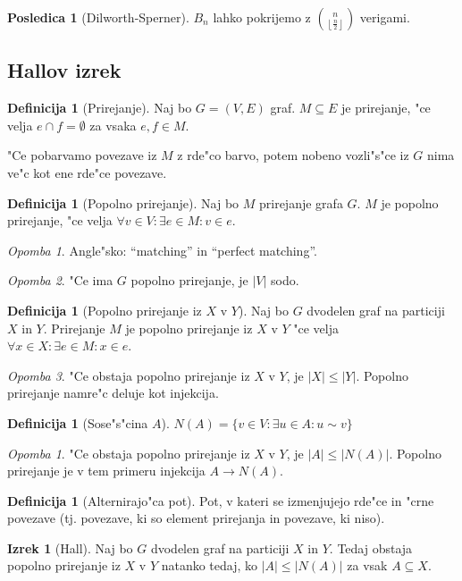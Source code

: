 \documentclass[a4paper,12pt]{article}
\theoremstyle{definition}
\newtheorem{defn}[counter]{Definicija}
\newtheorem{conseq}[counter]{Posledica}
\newtheorem{theorem}[counter]{Izrek}
\theoremstyle{remark}
\newtheorem*{rem}{Opomba}
\newtheorem{rem*}[counter]{Opomba}
\begin{document}
\begin{conseq}[Dilworth-Sperner]
	$B_n$ lahko pokrijemo z $\binom{n}{\left\lfloor\frac{n}{2}\right\rfloor}$ verigami.
\end{conseq}

\subsection{Hallov izrek}
\begin{defn}[Prirejanje]
	Naj bo $G=(V, E)$ graf. $M \subseteq E$ je prirejanje, "ce velja $e \cap f = \emptyset$ za vsaka $e, f \in M$.
\end{defn}
"Ce pobarvamo povezave iz $M$ z rde"co barvo, potem nobeno vozli"s"ce iz $G$ nima ve"c kot ene rde"ce povezave.
\begin{defn}[Popolno prirejanje]
	Naj bo $M$ prirejanje grafa $G$. $M$ je popolno prirejanje, "ce velja $\forall v \in V: \exists e \in M: v \in e$.
\end{defn}
\begin{rem}
	Angle"sko: ``matching'' in ``perfect matching''.
\end{rem}
\begin{rem}
	"Ce ima $G$ popolno prirejanje, je $|V|$ sodo.
\end{rem}
\begin{defn}[Popolno prirejanje iz $X$ v $Y$]
	Naj bo $G$ dvodelen graf na particiji $X$ in $Y$. Prirejanje $M$ je popolno prirejanje iz $X$ v $Y$ "ce velja $\forall x \in X: \exists e \in M: x \in e$.
\end{defn}
\begin{rem}
	"Ce obstaja popolno prirejanje iz $X$ v $Y$, je $|X| \leqslant |Y|$. Popolno prirejanje namre"c deluje kot injekcija.
\end{rem}
\begin{defn}[Sose"s"cina $A$]
	$N(A) = \{v \in V: \exists u \in A: u \sim v\}$
\end{defn}
\begin{rem*}
	"Ce obstaja popolno prirejanje iz $X$ v $Y$, je $|A| \leqslant |N(A)|$. Popolno prirejanje je v tem primeru injekcija $A \rightarrow N(A)$.
	\label{hall_desno}
\end{rem*}
\begin{defn}[Alternirajo"ca pot]
	Pot, v kateri se izmenjujejo rde"ce in "crne povezave (tj. povezave, ki so element prirejanja in povezave, ki niso).
\end{defn}
\begin{theorem}[Hall]
	Naj bo $G$ dvodelen graf na particiji $X$ in $Y$. Tedaj obstaja popolno prirejanje iz $X$ v $Y$ natanko tedaj, ko $|A| \leqslant |N(A)|$ za vsak $A \subseteq X$.
\end{theorem}
\end{document}
